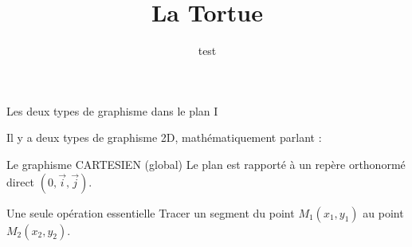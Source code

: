 \documentclass[10pt]{beamer}
\title{La Tortue}
\begin{document}
\maketitle

\begin{frame}{Les deux types de graphisme dans le plan I}
\subtitle{test}
  Il y a deux types de graphisme 2D, mathématiquement parlant :
  \begin{alertblock}{Le graphisme CARTESIEN (global)}
    Le plan est rapporté à un repère orthonormé direct $(0,\vec{i},\vec{j})$.
  \end{alertblock}

  \begin{block}{Une seule opération essentielle}
    \alert{Tracer un segment} du point $M_1 (x_1,y_1)$ au point $M_2 (x_2, y_2)$.
  \end{block}
  \begin{center}
  \end{center}
\end{frame}
\end{document}
